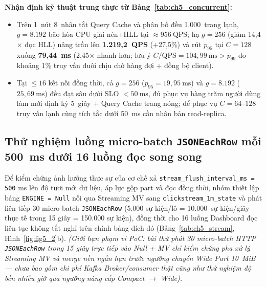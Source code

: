 \documentclass[13pt,a4paper]{report}
\begin{document}
\noindent\textbf{Nhận định kỹ thuật trung thực từ Bảng~\ref{tab:ch5_concurrent}:}
\begin{itemize}
    \setlength{\itemsep}{2pt}\setlength{\parskip}{0pt}
    \item Trên 1~nút 8~nhân tắt Query Cache và phân bố đều 1.000~trang lạnh, $g = 8.192$ bão hòa CPU giải nén+HLL tại $\approx 956~\text{QPS}$; hạ $g = 256$ (giảm 14,4${\times}$ đọc HLL) nâng trần lên \textbf{1.219,2~QPS} (+27,5\%) và rút $p_{95}$ tại $C = 128$ xuống \textbf{79,44~ms} (2,45${\times}$ nhanh hơn; lưu ý $C / \text{QPS} = 104{,}99~\text{ms} > p_{99}$ do khoảng 1\% truy vấn đuôi chịu chờ hàng đợi + đồng bộ client).
    \item Tại $\le 16$ kết nối đồng thời, cả $g=256$ ($p_{95} = 19{,}95~\text{ms}$) và $g=8.192$ ($25{,}69~\text{ms}$) đều đạt sâu dưới SLO $< 50~\text{ms}$, đủ phục vụ hàng trăm người dùng làm mới định kỳ 5~giây + Query Cache trang nóng; để phục vụ $C = 64\text{--}128$ truy vấn lạnh cùng tích tắc dưới 50~ms cần nhân bản read-replica.
\end{itemize}

\subsection{Thử nghiệm luồng micro-batch \texorpdfstring{\texttt{JSONEachRow}}{JSONEachRow} mỗi 500~ms dưới 16 luồng đọc song song}
Để kiểm chứng ảnh hưởng thực sự của cơ chế xả \texttt{stream\_\allowbreak{}flush\_\allowbreak{}interval\_\allowbreak{}ms = 500} ms lên độ tươi mới dữ liệu, áp lực gộp part và đọc đồng thời, nhóm thiết lập bảng \texttt{ENGINE = Null} nối qua Streaming MV sang \texttt{clickstream\_\allowbreak{}1m\_\allowbreak{}state} và phát liên tiếp 30 micro-batch \texttt{JSONEachRow} (5.000 sự kiện/lô = 10.000~sự kiện/giây thực tế trong 15 giây = 150.000 sự kiện), đồng thời cho 16 luồng Dashboard đọc liên tục không tắt nghỉ trên chính bảng đích đó (Bảng~\ref{tab:ch5_stream}, Hình~\ref{fig:fig5_2}b). \textit{(Giới hạn phạm vi PoC: bài thử phát 30 micro-batch HTTP \texttt{JSONEachRow} trong 15 giây trực tiếp vào Null + MV chỉ kiểm chứng pha xử lý Streaming MV và merge nền ngắn hạn trước ngưỡng chuyển Wide Part 10~MiB --- chưa bao gồm chi phí Kafka Broker/consumer thật cũng như thử nghiệm độ bền nhiều giờ qua ngưỡng nâng cấp Compact $\rightarrow$ Wide).}
\end{document}
